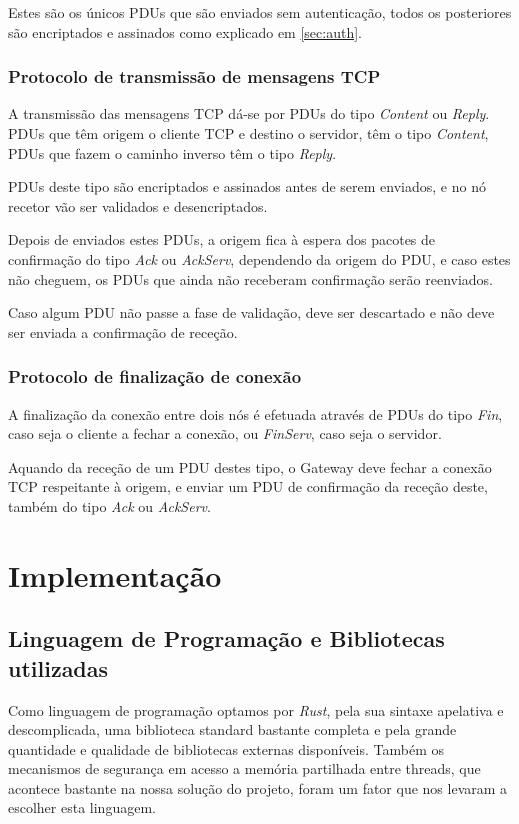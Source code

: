 \documentclass[a4paper]{report}
\begin{document}
Estes são os únicos PDUs que são enviados sem autenticação, todos os
posteriores são encriptados e assinados como explicado em \ref{sec:auth}.

\subsection{Protocolo de transmissão de mensagens TCP}

A transmissão das mensagens TCP dá-se por PDUs do tipo \textit{Content} ou
\textit{Reply}. PDUs que têm origem o cliente TCP e destino o servidor,
têm o tipo \textit{Content}, PDUs que fazem o caminho inverso têm o tipo
\textit{Reply}.

PDUs deste tipo são encriptados e assinados antes de serem enviados, e no
nó recetor vão ser validados e desencriptados.

Depois de enviados estes PDUs, a origem fica à espera dos pacotes de confirmação
do tipo \textit{Ack} ou \textit{AckServ}, dependendo da origem do PDU, e caso
estes não cheguem, os PDUs que ainda não receberam confirmação serão reenviados.

Caso algum PDU não passe a fase de validação, deve ser descartado e não deve
ser enviada a confirmação de receção.

\subsection{Protocolo de finalização de conexão}

A finalização da conexão entre dois nós é efetuada através de PDUs do tipo
\textit{Fin}, caso seja o cliente a fechar a conexão, ou \textit{FinServ},
caso seja o servidor.

Aquando da receção de um PDU destes tipo, o Gateway deve fechar a conexão TCP
respeitante à origem, e enviar um PDU de confirmação da receção deste, também
do tipo \textit{Ack} ou \textit{AckServ}.

\chapter{Implementação}

\section{Linguagem de Programação e Bibliotecas utilizadas}

Como linguagem de programação optamos por \textit{Rust}, pela sua sintaxe
apelativa e descomplicada, uma biblioteca standard bastante completa e pela
grande quantidade e qualidade de bibliotecas externas disponíveis. Também
os mecanismos de segurança em acesso a memória partilhada entre threads,
que acontece bastante na nossa solução do projeto, foram um fator que nos
levaram a escolher esta linguagem.
\end{document}
